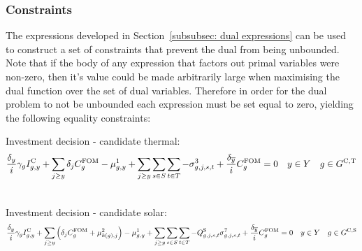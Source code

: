 \documentclass{article}
\begin{document}
\subsubsection{Constraints}
The expressions developed in Section~\ref{subsubsec: dual expressions} can be used to construct a set of constraints that prevent the dual from being unbounded. Note that if the body of any expression that factors out primal variables were non-zero, then it's value could be made arbitrarily large when maximising the dual function over the set of dual variables. Therefore in order for the dual problem to not be unbounded each expression must be set equal to zero, yielding the following equality constraints:

Investment decision - candidate thermal:
\begin{align}
& \frac{\cDiscountRate}{\cInterestRate} \cAmortisationRate \cCandidateInvestmentCost + \sum\limits_{\iYearAlias \geq \iYear} \cDiscountRate[\iYearAlias] \cFixedOperationsMaintenanceCostGenerator - \dNonNegativeCandidateCapacity + \sum\limits_{\iYearAlias \geq \iYear} \sum\limits_{\iScenario \in \sScenarios} \sum\limits_{\iInterval \in \sIntervals} - \dMaxPowerOutputCandidateThermal[\iGenerator,\iYearAlias,\iScenario,\iInterval] + \frac{\cDiscountRate[\iYearTerminal]}{\cInterestRate}\cFixedOperationsMaintenanceCostGenerator = 0 \quad  \iYear \in \sYears \quad  \iGenerator \in \sGeneratorsCandidateThermal \\\nonumber
\label{eqn: dual candidate thermal investment}
\end{align}

Investment decision - candidate solar:
\begin{align}
& \frac{\cDiscountRate}{\cInterestRate} \cAmortisationRate \cCandidateInvestmentCost + \sum\limits_{\iYearAlias \geq \iYear} \left(\cDiscountRate[\iYearAlias] \cFixedOperationsMaintenanceCostGenerator + \dSolarBuildLimit[k(\iGenerator), \iYearAlias] \right) - \dNonNegativeCandidateCapacity 
+ \sum\limits_{\iYearAlias \geq \iYear} \sum\limits_{\iScenario \in \sScenarios} \sum\limits_{\iInterval \in \sIntervals} - \cCapacityFactorSolar[\iGenerator,\iYearAlias,\iScenario,\iInterval] \dMaxPowerOutputSolarCandidate[\iGenerator,\iYearAlias,\iScenario,\iInterval] + \frac{\cDiscountRate[\iYearTerminal]}{\cInterestRate}\cFixedOperationsMaintenanceCostGenerator = 0 \quad  \iYear \in \sYears \quad  \iGenerator \in \sGeneratorsCandidateSolar \\\nonumber
\end{align}
\end{document}
